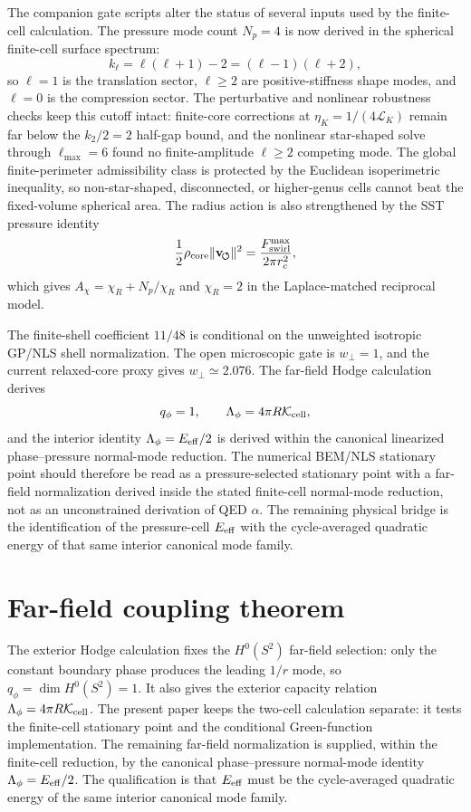\documentclass[11pt]{article}
\begin{document}
The companion gate scripts alter the status of several inputs used by the
finite-cell calculation.  The pressure mode count \(N_p=4\) is now derived in
the spherical finite-cell surface spectrum:
\[
  k_\ell=\ell(\ell+1)-2=(\ell-1)(\ell+2),
\]
so \(\ell=1\) is the translation sector, \(\ell\ge2\) are positive-stiffness
shape modes, and \(\ell=0\) is the compression sector.  The perturbative and nonlinear robustness checks keep this cutoff intact:
finite-core corrections at \(\eta_K=1/(4\mathcal L_K)\) remain far below the
\(k_2/2=2\) half-gap bound, and the nonlinear star-shaped solve through
\(\ell_{\max}=6\) found no finite-amplitude \(\ell\ge2\) competing mode.  The
global finite-perimeter admissibility class is protected by the Euclidean
isoperimetric inequality, so non-star-shaped, disconnected, or higher-genus
cells cannot beat the fixed-volume spherical area.
  The radius action is
also strengthened by the SST pressure identity
\[
  \frac12\rho_{\rm core}
  \lVert\mathbf v_{\!\boldsymbol{\circlearrowleft}}\rVert^2
  =
  \frac{F_{\rm swirl}^{\max}}{2\pi r_c^2},
\]
which gives \(A_\chi=\chi_R+N_p/\chi_R\) and \(\chi_R=2\) in the
Laplace-matched reciprocal model.

The finite-shell coefficient \(11/48\) is conditional on the unweighted
isotropic GP/NLS shell normalization.  The open microscopic gate is
\(w_\perp=1\), and the current relaxed-core proxy gives \(w_\perp\simeq2.076\).
The far-field Hodge calculation derives
\[
  q_\phi=1,
  \qquad
  \Lambda_\phi=4\pi R\mathcal K_{\rm cell},
\]
and the interior identity \(\Lambda_\phi=E_{\rm eff}/2\) is derived within
the canonical linearized phase--pressure normal-mode reduction.  The numerical
BEM/NLS stationary point should therefore be read as a pressure-selected
stationary point with a far-field normalization derived inside the stated
finite-cell normal-mode reduction, not as an unconstrained derivation of QED
\(\alpha\).  The remaining physical bridge is the identification of the
pressure-cell \(E_{\rm eff}\) with the cycle-averaged quadratic energy of that
same interior canonical mode family.

\section{Far-field coupling theorem}


The exterior Hodge calculation fixes the \(H^0(S^2)\) far-field selection:
only the constant boundary phase produces the leading \(1/r\) mode, so
\(q_\phi=\dim H^0(S^2)=1\).  It also gives the exterior capacity relation
\(\Lambda_\phi=4\pi R\mathcal K_{\rm cell}\).  The present paper keeps the
two-cell calculation separate: it tests the finite-cell stationary point and
the conditional Green-function implementation.  The remaining far-field normalization is supplied, within the finite-cell
reduction, by the canonical phase--pressure normal-mode identity
\(\Lambda_\phi=E_{\rm eff}/2\).  The qualification is that \(E_{\rm eff}\) must
be the cycle-averaged quadratic energy of the same interior canonical mode
family.
\end{document}
